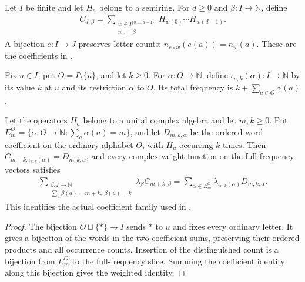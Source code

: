 \begin{definition}
    \label{def:full_word_coefficient}
    \leanok
    Let $I$ be finite and let $H_a$ belong to a semiring. For $d\ge0$ and
    $\beta:I\to\mathbb N$, define
    \begin{align*}
        C_{d,\beta}=\sum_{\substack{w\in I^{\{0,\ldots,d-1\}} \\n_w=\beta}}
        H_{w(0)}\cdots H_{w(d-1)}.
    \end{align*}
    A bijection $e:I\to J$ preserves letter counts:
    $n_{e\circ w}(e(a))=n_w(a)$.
    These are the coefficients in \cite[Lemma~4.2]{Arad2013AreaLaw}.
\end{definition}

\begin{definition}
    \label{def:insert_marker_frequency}
    \leanok
    Fix $u\in I$, put $O=I\setminus\{u\}$, and let $k\ge0$.
    For $\alpha:O\to\mathbb N$, define $\iota_{u,k}(\alpha):I\to\mathbb N$
    by its value $k$ at $u$ and its restriction $\alpha$ to $O$.
    Its total frequency is $k+\sum_{a\in O}\alpha(a)$.
\end{definition}

\begin{theorem}
    \label{thm:one_marker_full_frequency_identity}
    \leanok
    Let the operators $H_a$ belong to a unital complex algebra and let $m,k\ge0$.
    Put $E_m^O=\{\alpha:O\to\mathbb N:\sum_a\alpha(a)=m\}$, and let
    $D_{m,k,\alpha}$ be the ordered-word coefficient on the ordinary alphabet
    $O$, with $H_u$ occurring $k$ times.
    Then $C_{m+k,\iota_{u,k}(\alpha)}=D_{m,k,\alpha}$, and every complex weight
    function on the full frequency vectors satisfies
    \begin{align*}
        \sum_{\substack{\beta:I\to\mathbb N \\\sum_a\beta(a)=m+k,\ \beta(u)=k}}
        \lambda_\beta C_{m+k,\beta}
        =\sum_{\alpha\in E_m^O}
        \lambda_{\iota_{u,k}(\alpha)}D_{m,k,\alpha}.
    \end{align*}
    This identifies the actual coefficient family used in
    \cite[Lemma~4.2]{Arad2013AreaLaw}.
\end{theorem}
\begin{proof}
    \leanok
    The bijection $O\sqcup\{*\}\to I$ sends $*$ to $u$ and fixes every
    ordinary letter. It gives a bijection of the words in the two coefficient
    sums, preserving their ordered products and all occurrence counts.
    Insertion of the distinguished count is a bijection from $E_m^O$ to the
    full-frequency slice. Summing the coefficient identity along this bijection
    gives the weighted identity.
\end{proof}
